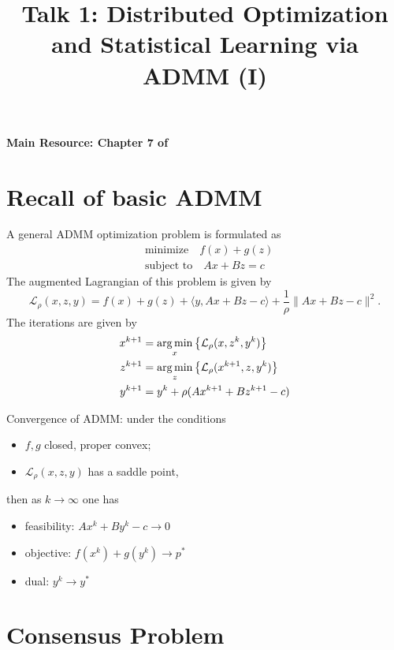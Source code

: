 
\title{Talk 1: Distributed Optimization and Statistical Learning via ADMM (I)}
\date{}
\author{}

\maketitle

{\bfseries Main Resource: Chapter 7 of \cite{boyd2011distributed}}

\section{Recall of basic ADMM}

A general ADMM optimization problem is formulated as
\begin{align*}
    & \text{minimize} \quad f(x) + g(z) \\
    & \text{subject to} \quad Ax + Bz = c
\end{align*}
The augmented Lagrangian of this problem is given by
$$\mathcal{L}_{\rho}(x,z,y) = f(x) + g(z) + \langle y, Ax+Bz-c \rangle + \dfrac{1}{\rho}\lVert Ax+Bz-c \rVert^2.$$
The iterations are given by
\begin{align*}
    x^{k+1} & = \operatorname*{arg\,min}_{x} \left\{ \mathcal{L}_{\rho}(x,z^k,y^k) \right\} \\
    z^{k+1} & = \operatorname*{arg\,min}_{z} \left\{ \mathcal{L}_{\rho}(x^{k+1},z,y^k) \right\} \\
    y^{k+1} & = y^{k} + \rho (Ax^{k+1}+Bz^{k+1}-c)
\end{align*}

Convergence of ADMM: under the conditions
\begin{itemize}
    \item $f,g$ closed, proper convex;
    \item $\mathcal{L}_{\rho}(x,z,y)$ has a saddle point,
\end{itemize}
then as $k\rightarrow\infty$ one has
\begin{itemize}
    \item feasibility: $Ax^k + By^k - c \rightarrow 0$
    \item objective: $f(x^k) + g(y^k) \rightarrow p^*$
    \item dual: $y^k \rightarrow y^*$
\end{itemize}

\section{Consensus Problem}

